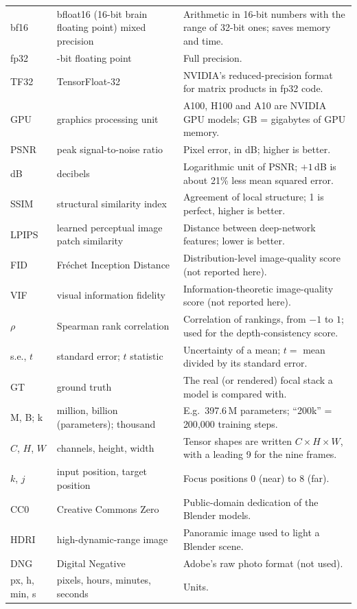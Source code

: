 \documentclass[11pt]{article}
\begin{document}
\begin{table}[p]
\begin{tabular}{@{}>{\raggedright\arraybackslash}p{2.2cm}>{\raggedright\arraybackslash}p{5.2cm}>{\raggedright\arraybackslash}p{8.0cm}@{}}
bf16 & bfloat16 (16-bit brain floating point) mixed precision & Arithmetic in 16-bit numbers with the range of 32-bit ones; saves memory and time.\\
fp32 & 32-bit floating point & Full precision.\\
TF32 & TensorFloat-32 & NVIDIA's reduced-precision format for matrix products in fp32 code.\\
GPU & graphics processing unit & A100, H100 and A10 are NVIDIA GPU models; GB = gigabytes of GPU memory.\\
PSNR & peak signal-to-noise ratio & Pixel error, in dB; higher is better.\\
dB & decibels & Logarithmic unit of PSNR; $+1$\,dB is about 21\% less mean squared error.\\
SSIM & structural similarity index & Agreement of local structure; 1 is perfect, higher is better.\\
LPIPS & learned perceptual image patch similarity & Distance between deep-network features; lower is better.\\
FID & Fr\'echet Inception Distance & Distribution-level image-quality score (not reported here).\\
VIF & visual information fidelity & Information-theoretic image-quality score (not reported here).\\
$\rho$ & Spearman rank correlation & Correlation of rankings, from $-1$ to $1$; used for the depth-consistency score.\\
s.e., $t$ & standard error; $t$ statistic & Uncertainty of a mean; $t=$ mean divided by its standard error.\\
GT & ground truth & The real (or rendered) focal stack a model is compared with.\\
M, B; k & million, billion (parameters); thousand & E.g.\ 397.6\,M parameters; ``200k'' = 200{,}000 training steps.\\
$C$, $H$, $W$ & channels, height, width & Tensor shapes are written $C\times H\times W$, with a leading 9 for the nine frames.\\
$k$, $j$ & input position, target position & Focus positions $0$ (near) to $8$ (far).\\
CC0 & Creative Commons Zero & Public-domain dedication of the Blender models.\\
HDRI & high-dynamic-range image & Panoramic image used to light a Blender scene.\\
DNG & Digital Negative & Adobe's raw photo format (not used).\\
px, h, min, s & pixels, hours, minutes, seconds & Units.\\
\bottomrule\end{tabular}\end{table}
\end{document}
